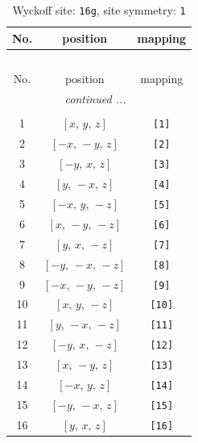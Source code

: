 \documentclass[fleqn,8pt]{jsarticle}
\begin{document}
\renewcommand{\arraystretch}{1.2}
\begin{longtable}{ccc}
\caption{Wyckoff site: {\tt 16g}, site symmetry: {\tt 1}}
 \\
 \hline \hline
No. & position & mapping \\ \hline \endfirsthead

\multicolumn{2}{l}{\tablename\ \thetable{}} \\
 \hline \hline
No. & position & mapping \\ \hline \endhead

 \hline \hline
\multicolumn{2}{r}{\footnotesize\it continued ...} \\ \endfoot

 \hline \hline
\multicolumn{2}{r}{} \\ \endlastfoot

1 & $\left[ x,\, y,\, z \right]$ & {\tt [1]} \\ \hline
2 & $\left[ - x,\, - y,\, z \right]$ & {\tt [2]} \\ \hline
3 & $\left[ - y,\, x,\, z \right]$ & {\tt [3]} \\ \hline
4 & $\left[ y,\, - x,\, z \right]$ & {\tt [4]} \\ \hline
5 & $\left[ - x,\, y,\, - z \right]$ & {\tt [5]} \\ \hline
6 & $\left[ x,\, - y,\, - z \right]$ & {\tt [6]} \\ \hline
7 & $\left[ y,\, x,\, - z \right]$ & {\tt [7]} \\ \hline
8 & $\left[ - y,\, - x,\, - z \right]$ & {\tt [8]} \\ \hline
9 & $\left[ - x,\, - y,\, - z \right]$ & {\tt [9]} \\ \hline
10 & $\left[ x,\, y,\, - z \right]$ & {\tt [10]} \\ \hline
11 & $\left[ y,\, - x,\, - z \right]$ & {\tt [11]} \\ \hline
12 & $\left[ - y,\, x,\, - z \right]$ & {\tt [12]} \\ \hline
13 & $\left[ x,\, - y,\, z \right]$ & {\tt [13]} \\ \hline
14 & $\left[ - x,\, y,\, z \right]$ & {\tt [14]} \\ \hline
15 & $\left[ - y,\, - x,\, z \right]$ & {\tt [15]} \\ \hline
16 & $\left[ y,\, x,\, z \right]$ & {\tt [16]} \\
\end{longtable}
\end{document}
